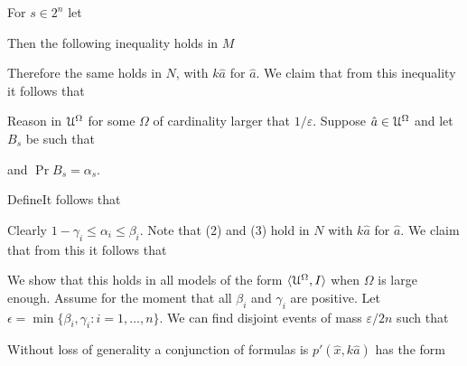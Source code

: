 \documentclass[10pt,oneside]{amsproc}
\begin{document}
For $s\in2^n$ let 



Then the following inequality holds in $M$


Therefore the same holds in $N$, with $k\hat a$ for $\hat a$.
We claim that from this inequality it follows that 


Reason in ${\EuScript U}^\Omega$ for some $\Omega$ of cardinality larger that $1/\varepsilon$.
Suppose $\hat a\in{\EuScript U}^\Omega$ and let $B_s$ be such that


and $\Pr B_s=\alpha_s$.




DefineIt follows that 




Clearly $1-\gamma_i\le\alpha_i\le\beta_i$.
Note that (2) and (3) hold in $N$ with $k\hat a$ for $\hat a$.
We claim that from this it follows that 


We show that this holds in all models of the form $\langle{\EuScript U}^\Omega, I\rangle$ when $\Omega$ is large enough.
Assume for the moment that all $\beta_i$ and $\gamma _i$ are positive.
Let $\epsilon=\min\{\beta_i,\gamma_i:i=1,\dots,n\}$.
We can find disjoint events of mass $\varepsilon/2n$ such that 


Without loss of generality a conjunction of formulas is $p'(\hat x,k\hat a)$ has the form 

\end{document}
